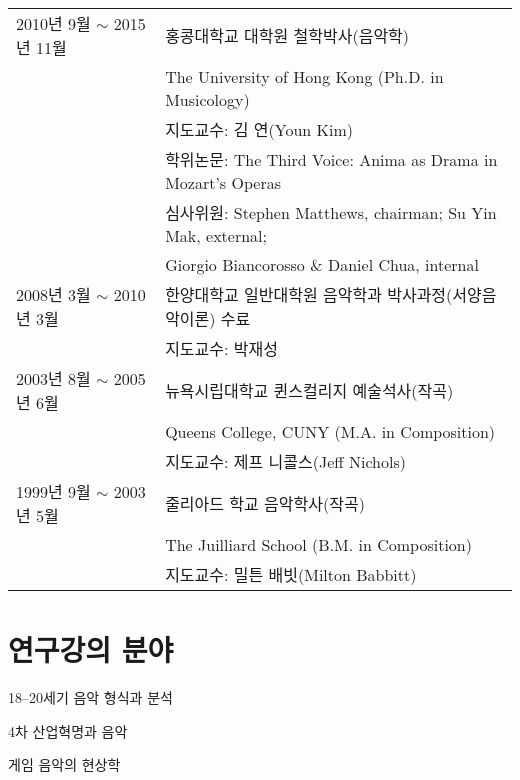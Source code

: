 \documentclass[dvipdfmx,a4paper]{article}
\begin{document}
  \hspace*{-0.25cm}
  \begin{tabular}{p{4.0cm} p{10.0cm}}
    2010년 9월 $\sim$ 2015년 11월 & 홍콩대학교 대학원 철학박사(음악학)\\
    & The University of Hong Kong (Ph.D. in Musicology)\\
    & 지도교수: 김 연(Youn Kim)\\
    & 학위논문: The Third Voice: Anima as Drama in Mozart’s Operas\\
    & 심사위원: Stephen Matthews, chairman; Su Yin Mak, external;\\
    & \hspace*{14mm} Giorgio Biancorosso \& Daniel Chua, internal\\[2mm]
    
    2008년 3월 $\sim$ 2010년 3월 & 한양대학교 일반대학원 음악학과 박사과정(서양음악이론) 수료\\
    & 지도교수: 박재성\\[2mm]
    
	2003년 8월 $\sim$ 2005년 6월 & 뉴욕시립대학교 퀸스컬리지 예술석사(작곡)\\
    & Queens College, CUNY (M.A. in Composition)\\
	& 지도교수: 제프 니콜스(Jeff Nichols)\\[2mm]

    1999년 9월 $\sim$ 2003년 5월 & 줄리아드 학교 음악학사(작곡)\\
    & The Juilliard School (B.M. in Composition)\\
    & 지도교수: 밀튼 배빗(Milton Babbitt)
  \end{tabular}
  
  \vspace{5mm}
  
  \section*{\normalsize 연구\textperiodcentered 강의 분야}
  
  \noindent \hspace{2mm} \textbullet \hspace{2mm} 18--20세기 음악 형식과 분석
  
  \noindent \hspace{2mm} \textbullet \hspace{2mm} 4차 산업혁명과 음악
  
  \noindent \hspace{2mm} \textbullet \hspace{2mm} 게임 음악의 현상학
  
\end{document}
